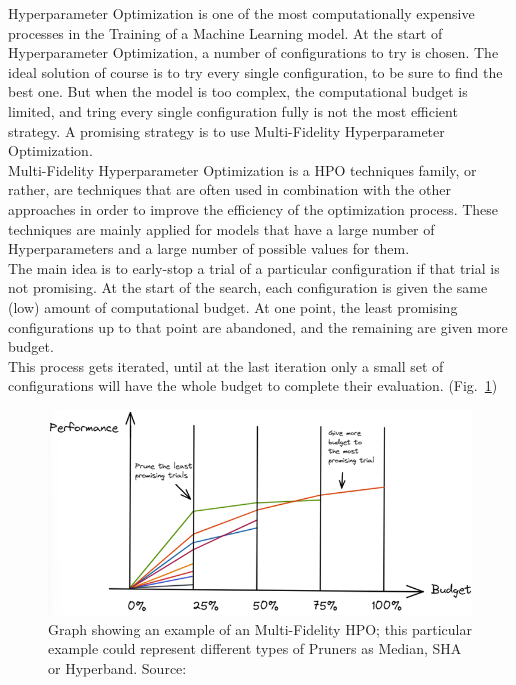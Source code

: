 Hyperparameter Optimization is one of the most computationally expensive processes in the Training of a Machine Learning model.
At the start of Hyperparameter Optimization, a number of configurations to try is chosen. The ideal solution of course is to try every single configuration, to be sure to find the best one.
But when the model is too complex, the computational budget is limited, and tring every single configuration fully is not the most efficient strategy.
A promising strategy is to use Multi-Fidelity Hyperparameter Optimization.
\\[0.3cm]Multi-Fidelity Hyperparameter Optimization is a HPO techniques family, or rather, are techniques that are often used in combination with the other approaches in order to improve the efficiency of the optimization process. These techniques are mainly applied for models that have a large number of Hyperparameters and a large number of possible values for them.
% 
\\[0.3cm]The main idea is to early-stop a trial of a particular configuration if that trial is not promising.
At the start of the search, each configuration is given the same (low) amount of computational budget. At one point, the least promising configurations up to that point are abandoned, and the remaining are given more budget.
\\[0.3cm]This process gets iterated, until at the last iteration only a small set of configurations will have the whole budget to complete their evaluation. (Fig.~\ref{fig:figure-2.3.1})
\begin{figure}[t]
	\centering
	\includegraphics[width=14cm]{figures/figure-2.3.1.png}
	\caption[Multi-Fidelity HPO Process Example]{Graph showing an example of an Multi-Fidelity HPO; this particular example could represent different types of Pruners as Median, SHA or Hyperband. Source:~\cite{Tesi-1.3}}
	\label{fig:figure-2.3.1}
\end{figure}

